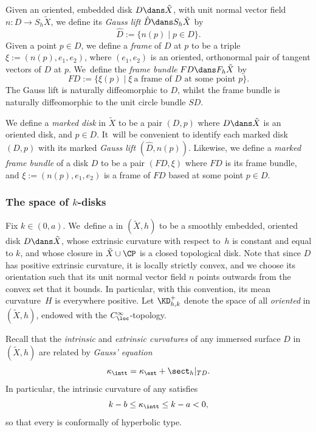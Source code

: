 Given an oriented, embedded disk $D\dans\tilde{X}$, with unit normal vector field $n:D\to S_h\tilde{X}$, we define its \emph{Gauss lift} $\hat{D}\dans S_h\tilde{X}$ by
\begin{equation*}
\hat{D} := \{n(p)\mid p\in D\}.
\end{equation*}
Given a point $p\in D$, we define a \emph{frame} of $D$ at $p$ to be a triple $\xi:=(n(p),e_1,e_2)$, where $(e_1,e_2)$ is an oriented, orthonormal pair of tangent vectors of $D$ at $p$. We~define the \emph{frame bundle} $FD\dans F_h\tilde{X}$ by
\begin{equation*}
FD := \{\xi(p)\mid \xi\ \text{a frame of $D$ at some point $p$}\}.
\end{equation*}
The Gauss lift is naturally diffeomorphic to $D$, whilst the frame bundle is naturally diffeomorphic to the unit circle bundle $SD$.

We define a \emph{marked disk} in $\tilde{X}$ to be a pair $(D,p)$ where $D\dans\tilde{X}$ is an oriented disk, and $p\in D$. It~will be convenient to identify each marked disk $(D,p)$ with its marked \emph{Gauss lift} $(\hat{D},n(p))$. Likewise, we define a \emph{marked frame bundle} of a disk $D$ to be a pair $(FD,\xi)$ where $FD$ is its frame bundle, and $\xi:=(n(p),e_1,e_2)$ is a frame of $FD$ based at some point $p\in D$.

\subsubsection{The space of $k$-disks}\label{sss.space_k_discs}
Fix $k\in(0,a)$. We~define a \emph{\kdisk} in $(\tilde{X},h)$ to be a smoothly embedded, oriented disk $D\dans \tilde{X}$, whose extrinsic curvature with respect to~$h$ is constant and equal to $k$, and whose closure in $\tilde{X}\cup\CP$ is a closed topological disk. Note that since $D$ has positive extrinsic curvature, it is locally strictly convex, and we choose its orientation such that its unit normal vector field $n$ points outwards from the convex set that it bounds. In particular, with this convention, its mean curvature~$H$ is everywhere positive. Let $\KD^+_{h,k}$ denote the space of all \emph{oriented} \kdisks in $(\tilde{X},h)$, endowed with the $C^\infty_{\loc}$-topology.

Recall that the \emph{intrinsic} and \emph{extrinsic curvatures} of any immersed surface $D$ in $(\tilde{X},h)$ are related by \emph{Gauss' equation}
\begin{equation}
\kappa_{\intt}=\kappa_{\ext}+\sect_h|_{TD}.
\end{equation}
In particular, the intrinsic curvature of any \kdisk satisfies
\begin{equation}\label{eq_intr_curv}
k-b\leq\kappa_{\intt}\leq k-a<0,
\end{equation}
so that every \kdisk is conformally of hyperbolic type.

